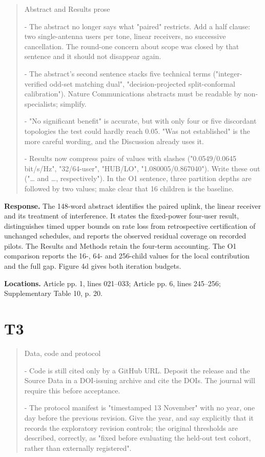 \documentclass[10pt,letterpaper]{article}
\begin{document}
\begin{quote}\small Abstract and Results prose

\par\noindent - The abstract no longer says what "paired" restricts. Add a half clause: two single-antenna users per tone, linear receivers, no successive cancellation. The round-one concern about scope was closed by that sentence and it should not disappear again.
\par\noindent - The abstract's second sentence stacks five technical terms ("integer-verified odd-set matching dual", "decision-projected split-conformal calibration"). Nature Communications abstracts must be readable by non-specialists; simplify.
\par\noindent - "No significant benefit" is accurate, but with only four or five discordant topologies the test could hardly reach 0.05. "Was not established" is the more careful wording, and the Discussion already uses it.
\par\noindent - Results now compress pairs of values with slashes ("0.0549/0.0645 bit/s/Hz", "32/64-user", "HUB/LO", "1.080005/0.867040"). Write these out ("\ldots{} and \ldots{}, respectively"). In the O1 sentence, three partition depths are followed by two values; make clear that 16 children is the baseline.\end{quote}

\textbf{Response.} The 148-word abstract identifies the paired uplink, the linear receiver and its treatment of interference. It states the fixed-power four-user result, distinguishes timed upper bounds on rate loss from retrospective certification of unchanged schedules, and reports the observed residual coverage on recorded pilots. The Results and Methods retain the four-term accounting. The O1 comparison reports the 16-, 64- and 256-child values for the local contribution and the full gap. Figure 4d gives both iteration budgets.

\textbf{Locations.} Article pp. 1, lines 021–033; Article pp. 6, lines 245–256; Supplementary Table 10, p. 20.

\section*{T3}

\begin{quote}\small Data, code and protocol

\par\noindent - Code is still cited only by a GitHub URL. Deposit the release and the Source Data in a DOI-issuing archive and cite the DOIs. The journal will require this before acceptance.
\par\noindent - The protocol manifest is "timestamped 13 November" with no year, one day before the previous revision. Give the year, and say explicitly that it records the exploratory revision controls; the original thresholds are described, correctly, as "fixed before evaluating the held-out test cohort, rather than externally registered".\end{quote}
\end{document}
